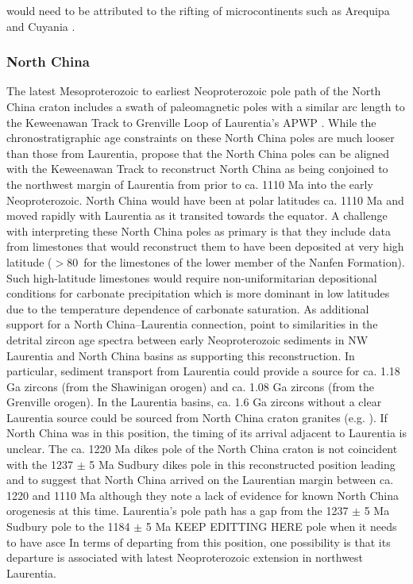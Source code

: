 \documentclass[twocolumn, switch]{article} %
\begin{document}
would need to be attributed to the rifting of microcontinents such as Arequipa and Cuyania \citep{Escayola2011a, Martin2019a}.

\subsubsection{North China}

The latest Mesoproterozoic to earliest Neoproterozoic pole path of the North China craton includes a swath of paleomagnetic poles with a similar arc length to the Keweenawan Track to Grenville Loop of Laurentia's APWP \citep{Zhao2019a, Zhang2021a}. While the chronostratigraphic age constraints on these North China poles are much looser than those from Laurentia, \cite{Zhao2019a} propose that the North China poles can be aligned with the Keweenawan Track to reconstruct North China as being conjoined to the northwest margin of Laurentia from prior to ca. 1110 Ma into the early Neoproterozoic. North China would have been at polar latitudes ca. 1110 Ma and moved rapidly with Laurentia as it transited towards the equator. A challenge with interpreting these North China poles as primary is that they include data from limestones that would reconstruct them to have been deposited at very high latitude ($>$80\textdegree\ for the limestones of the lower member of the Nanfen Formation). Such high-latitude limestones would require non-uniformitarian depositional conditions for carbonate precipitation which is more dominant in low latitudes due to the temperature dependence of carbonate saturation. As additional support for a North China--Laurentia connection, \cite{Zhao2019a} point to similarities in the detrital zircon age spectra between early Neoproterozoic sediments in NW Laurentia and North China basins as supporting this reconstruction. In particular, sediment transport from Laurentia could provide a source for ca. 1.18 Ga zircons (from the Shawinigan orogen) and ca. 1.08 Ga zircons (from the Grenville orogen). In the Laurentia basins, ca. 1.6 Ga zircons without a clear Laurentia source could be sourced from North China craton granites (e.g. \citealp{Wang2020a}). If North China was in this position, the timing of its arrival adjacent to Laurentia is unclear. The ca. 1220 Ma dikes pole of the North China craton is not coincident with the 1237 $\pm$ 5 Ma Sudbury dikes pole in this reconstructed position leading \cite{Zhao2019a} and \cite{Zhang2021a} to suggest that North China arrived on the Laurentian margin between ca. 1220 and 1110 Ma although they note a lack of evidence for known North China orogenesis at this time. Laurentia's pole path has a gap from the 1237 $\pm$ 5 Ma Sudbury pole to the 1184 $\pm$ 5 Ma KEEP EDITTING HERE pole when it needs to have asce In terms of departing from this position, one possibility is that its departure is associated with latest Neoproterozoic extension in northwest Laurentia.
\end{document}

